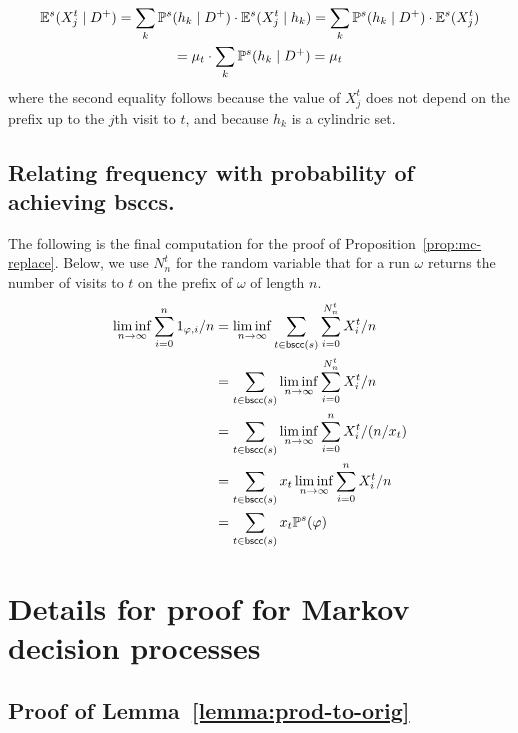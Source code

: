 \documentclass[a4paper,UKenglish]{lipics}
\newcommand{\bscc}[1]{\mathsf{bscc}(#1)}
\newcommand{\E}[2][]{\ifblank{#1}{\mathbb{E}(#2)}{\mathbb{E}^{#1}(#2)}}
\renewcommand{\P}[2][]{\ifblank{#1}{\mathbb{P}(#2)}{\mathbb{P}^{#1}(#2)}}
\newcommand{\ssf}[1]{x_{#1}}
\begin{document}
\begin{multline*}
\E[s]{X^t_j \mid D^+} = \sum_{k} \P[s]{h_k\mid D^+}\cdot \E[s]{X^t_j \mid h_k} = \sum_{k} \P[s]{h_k\mid D^+}\cdot \E[s]{X^t_j}\\= \mu_t\cdot \sum_{k} \P[s]{h_k\mid D^+} = \mu_t
\end{multline*}
where the second equality follows because the value of $X^t_j$ does not depend on the prefix up to the $j$th visit to $t$, and because $h_k$ is a cylindric set.
\subsection{Relating frequency with probability of achieving bsccs.}
\label{app:mc-bscc}
The following is the final computation for the proof of Proposition~\ref{prop:mc-replace}. Below, we use $N^t_n$ for the random variable
that for a run $\omega$ returns the number of visits to $t$ on the prefix of $\omega$ of length $n$.
\begin{align*}
\liminf_{n\rightarrow\infty} \sum_{i=0}^n 1_{\varphi,i} / n &= \liminf_{n\rightarrow\infty} \sum_{t \in\bscc{s}} \sum_{i=0}^{N_n^t} X^t_i / n\\
&= \sum_{t \in\bscc{s}} \liminf_{n\rightarrow\infty} \sum_{i=0}^{N_n^t} X^t_i / n\\
&= \sum_{t \in\bscc{s}} \liminf_{n\rightarrow\infty} \sum_{i=0}^{n} X^t_i / (n/\ssf{t})\\
&= \sum_{t \in\bscc{s}} \ssf{t} \liminf_{n\rightarrow\infty} \sum_{i=0}^{n} X^t_i / n\\
&= \sum_{t \in\bscc{s}} \ssf{t} \P[s]{\varphi}\\
\end{align*} 




\section{Details for proof for Markov decision processes} \label{app:algorithm}

\subsection{Proof of Lemma~\ref{lemma:prod-to-orig}}
\end{document}
